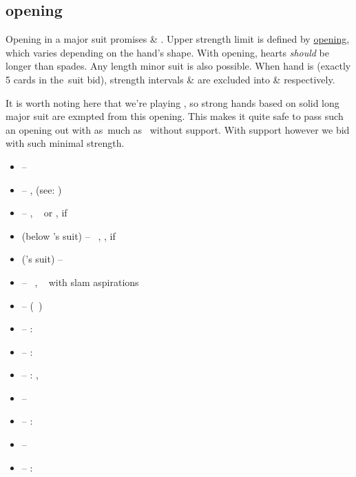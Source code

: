 \subsection{\ctr{1\protect\major} opening}
\label{subsec:1maj-op}

Opening in a major suit promises  \& . Upper strength limit is defined by
\hyperref[subsec:2c-op]{\ctr{2\c} opening}, which varies depending on the hand's shape. With \ctr{1\h} opening, hearts
\emph{should} be longer than spades. Any length minor suit is also possible. When hand is \bal\/ (exactly 5 cards in
the~suit bid), strength intervals  \&  are excluded into \ctr{1\nt} \& \ctr{2\nt} respectively.

It is worth noting here that  we're playing \hyperref[subsec:namyats]{}, so strong hands based on solid
long major suit are exmpted from this opening. This makes it quite safe to pass such an opening out with as~much
as~ without support. With support however we bid \hyperref[subsec:1nt-fc]{\ctr{1\nt} \force}\/ with such
minimal strength. \vspace{1em}

\begin{itemize}
   \newcommand{\strongws}{\hcp{16}{} if \ws{}}

  \item \ctr{1\s} --  
  \item \ctr{1\nt} -- \art, \force\/ (see: \hyperref[subsec:1nt-fc]{})
  \item \ctr{2\c} -- \semi\nat, \gf\ \bal\/ or , \strongws
  \item \ctr{2\d/\h} (below \opn's suit) -- \nat\ \gf, , \strongws
  \item \ctr{2\major} (\opn's suit) --  \ws{}
  \item \ctr{2\s} -- \nat\ \gf, \sol\  with slam aspirations
  \item \ctr{2\nt} -- \hyperref[subsec:jacoby]{} (\gf\ \ws{})
  \item \ctr{3\c} -- :  
  \item \ctr{3\d} -- :  
  \item {} -- :  , 
  \item {} -- \preempt\ 
  \item \ctr{3\s} -- : \gf\  \ws{} \shortness{\s}
  \item \ctr{3\nt} -- \so
  \item \ctr{4\minor} -- : \gf\  \ws{} \shortness{\minor}
\end{itemize}
